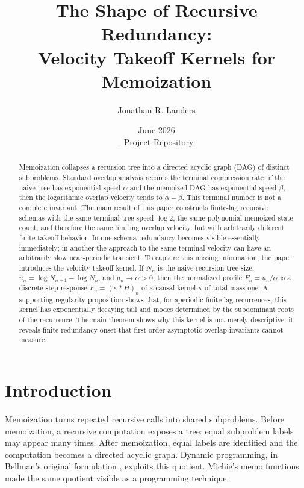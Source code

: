\documentclass[10pt,twocolumn]{article}
\title{\vspace{-1.0em}The Shape of Recursive Redundancy:\\
Velocity Takeoff Kernels for Memoization}
\author{Jonathan R. Landers}
\date{June 2026\\[0.25em]
\href{https://github.com/jonland82/finite-response-kernels}{\faGithub\ Project Repository}}
\begin{document}
\maketitle
\vspace{-1.4em}

\begin{abstract}
Memoization collapses a recursion tree into a directed acyclic graph (DAG) of distinct subproblems.  Standard overlap analysis records the terminal compression rate: if the naive tree has exponential speed \(\alpha\) and the memoized DAG has exponential speed \(\beta\), then the logarithmic overlap velocity tends to \(\alpha-\beta\).  This terminal number is not a complete invariant.  The main result of this paper constructs finite-lag recursive schemas with the same terminal tree speed \(\log 2\), the same polynomial memoized state count, and therefore the same limiting overlap velocity, but with arbitrarily different finite takeoff behavior.  In one schema redundancy becomes visible essentially immediately; in another the approach to the same terminal velocity can have an arbitrarily slow near-periodic transient.  To capture this missing information, the paper introduces the velocity takeoff kernel.  If \(N_n\) is the naive recursion-tree size, \(u_n=\log N_{n+1}-\log N_n\), and \(u_n\to\alpha>0\), then the normalized profile \(F_n=u_n/\alpha\) is a discrete step response \(F_n=(\kappa*H)_n\) of a causal kernel \(\kappa\) of total mass one.  A supporting regularity proposition shows that, for aperiodic finite-lag recurrences, this kernel has exponentially decaying tail and modes determined by the subdominant roots of the recurrence.  The main theorem shows why this kernel is not merely descriptive: it reveals finite redundancy onset that first-order asymptotic overlap invariants cannot measure.
\end{abstract}

\section{Introduction}

Memoization turns repeated recursive calls into shared subproblems.  Before memoization, a recursive computation exposes a tree: equal subproblem labels may appear many times.  After memoization, equal labels are identified and the computation becomes a directed acyclic graph.  Dynamic programming, in Bellman's original formulation \cite{bellman1957}, exploits this quotient.  Michie's memo functions \cite{michie1968} made the same quotient visible as a programming technique.
\end{document}
